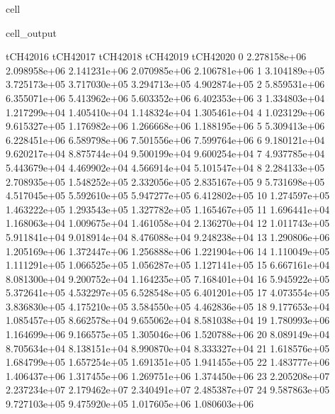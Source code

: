 \documentclass[letterpaper,10pt,english]{jupyterBook}
\begin{document}
\begin{sphinxuseclass}{cell}
\begin{sphinxVerbatimOutput}
\begin{sphinxuseclass}{cell_output}
\begin{sphinxVerbatim}[commandchars=\\\{\}]
       tCH4\PYGZus{}2016     tCH4\PYGZus{}2017     tCH4\PYGZus{}2018     tCH4\PYGZus{}2019     tCH4\PYGZus{}2020  \PYGZbs{}
0   2.278158e+06  2.098958e+06  2.141231e+06  2.070985e+06  2.106781e+06   
1   3.104189e+05  3.725173e+05  3.717030e+05  3.294713e+05  4.902874e+05   
2   5.859531e+06  6.355071e+06  5.413962e+06  5.603352e+06  6.402353e+06   
3   1.334803e+04  1.217299e+04  1.405410e+04  1.148324e+04  1.305461e+04   
4   1.023129e+06  9.615327e+05  1.176982e+06  1.266668e+06  1.188195e+06   
5   5.309413e+06  6.228451e+06  6.589798e+06  7.501556e+06  7.599764e+06   
6   9.180121e+04  9.620217e+04  8.875744e+04  9.500199e+04  9.600254e+04   
7   4.937785e+04  5.443679e+04  4.469902e+04  4.566914e+04  5.101547e+04   
8   2.284133e+05  2.708935e+05  1.548252e+05  2.332056e+05  2.835167e+05   
9   5.731698e+05  4.517045e+05  5.592610e+05  5.947277e+05  6.412802e+05   
10  1.274597e+05  1.463222e+05  1.293543e+05  1.327782e+05  1.165467e+05   
11  1.696441e+04  1.168063e+04  1.009675e+04  1.461058e+04  2.136270e+04   
12  1.011743e+05  5.911841e+04  9.018914e+04  8.476088e+04  9.248238e+04   
13  1.290806e+06  1.205169e+06  1.372447e+06  1.256888e+06  1.221904e+06   
14  1.110049e+05  1.111291e+05  1.066525e+05  1.056287e+05  1.127141e+05   
15  6.667161e+04  8.081300e+04  9.200752e+04  1.164235e+05  7.168401e+04   
16  5.945922e+05  5.372641e+05  4.532297e+05  6.528548e+05  6.401201e+05   
17  4.073554e+05  3.836830e+05  4.175210e+05  3.584550e+05  4.462836e+05   
18  9.177653e+04  1.085457e+05  8.662578e+04  9.655062e+04  8.581038e+04   
19  1.780993e+06  1.164699e+06  9.166575e+05  1.305046e+06  1.520788e+06   
20  8.089149e+04  8.705634e+04  8.138151e+04  8.990870e+04  8.333327e+04   
21  1.618576e+05  1.684799e+05  1.657254e+05  1.691351e+05  1.941455e+05   
22  1.483777e+06  1.406437e+06  1.317455e+06  1.269751e+06  1.374450e+06   
23  2.205208e+07  2.237234e+07  2.179462e+07  2.340491e+07  2.485387e+07   
24  9.587863e+05  9.727103e+05  9.475920e+05  1.017605e+06  1.080603e+06   


\end{sphinxVerbatim}
\end{sphinxuseclass}
\end{sphinxVerbatimOutput}
\end{sphinxuseclass}
\end{document}
